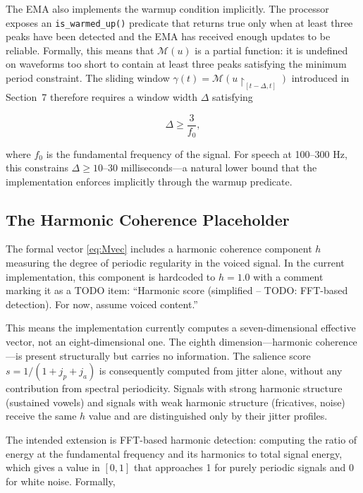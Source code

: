 \documentclass[12pt, a4paper]{article}
\begin{document}
The EMA also implements the warmup condition implicitly. The processor exposes an \texttt{is\_warmed\_up()} predicate that returns true only when at least three peaks have been detected and the EMA has received enough updates to be reliable. Formally, this means that $\mathcal{M}(u)$ is a partial function: it is undefined on waveforms too short to contain at least three peaks satisfying the minimum period constraint. The sliding window $\gamma(t) = \mathcal{M}(u\!\upharpoonright_{[t-\Delta, t]})$ introduced in Section~7 therefore requires a window width $\Delta$ satisfying

\begin{equation}
\Delta \geq \frac{3}{f_0},
\label{eq:warmup}
\end{equation}

where $f_0$ is the fundamental frequency of the signal. For speech at 100--300 Hz, this constrains $\Delta \geq 10$--$30$ milliseconds---a natural lower bound that the implementation enforces implicitly through the warmup predicate.

\subsection{The Harmonic Coherence Placeholder}

The formal vector \eqref{eq:Mvec} includes a harmonic coherence component $h$ measuring the degree of periodic regularity in the voiced signal. In the current implementation, this component is hardcoded to $h = 1.0$ with a comment marking it as a TODO item: \enquote{Harmonic score (simplified -- TODO: FFT-based detection). For now, assume voiced content.}

This means the implementation currently computes a seven-dimensional effective vector, not an eight-dimensional one. The eighth dimension---harmonic coherence---is present structurally but carries no information. The salience score $s = 1/(1 + j_p + j_a)$ is consequently computed from jitter alone, without any contribution from spectral periodicity. Signals with strong harmonic structure (sustained vowels) and signals with weak harmonic structure (fricatives, noise) receive the same $h$ value and are distinguished only by their jitter profiles.

The intended extension is FFT-based harmonic detection: computing the ratio of energy at the fundamental frequency and its harmonics to total signal energy, which gives a value in $[0,1]$ that approaches 1 for purely periodic signals and 0 for white noise. Formally,
\end{document}
